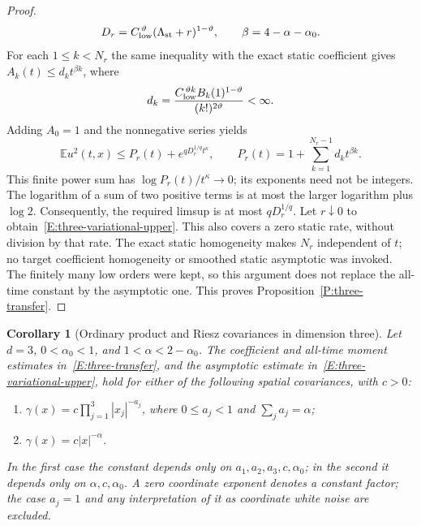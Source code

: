 \documentclass[12pt]{article}
\numberwithin{equation}{section}
\newtheorem{corollary}[theorem]{Corollary}
\theoremstyle{definition}
\newcommand{\E}{\mathbb{E}}
\begin{document}
\begin{proof}
\[    D_r=C_{\rm low}^{\,\vartheta}(\Lambda_{\rm st}+r)^{1-\vartheta},
    \qquad \beta=4-\alpha-\alpha_0.
  \]
  For each $1\le k<N_r$ the same inequality with the exact static
  coefficient gives $A_k(t)\le d_kt^{\beta k}$, where
  \[
    d_k=\frac{C_{\rm low}^{\,\vartheta k}
    B_k(1)^{1-\vartheta}}{(k!)^{2\vartheta}}<\infty.
  \]
  Adding $A_0=1$ and the nonnegative series yields
  \[
    \E u^2(t,x)\le P_r(t)+e^{qD_r^{1/q}t^\kappa},\qquad
    P_r(t)=1+\sum_{k=1}^{N_r-1}d_kt^{\beta k}.
  \]
  This finite power sum has $\log P_r(t)/t^\kappa\to0$; its
  exponents need not be integers. The logarithm of a sum of two
  positive terms is at most the larger logarithm plus $\log2$.
  Consequently, the required limsup is at most $qD_r^{1/q}$.
  Let $r\downarrow0$ to obtain~\eqref{E:three-variational-upper}.
  This also covers a zero static rate, without division by that rate.
  The exact static homogeneity makes $N_r$ independent of $t$;
  no target coefficient homogeneity or smoothed static asymptotic was
  invoked. The finitely many low orders were kept, so this argument
  does not replace the all-time constant by the asymptotic one.
  This proves Proposition~\ref{P:three-transfer}.
\end{proof}

\begin{corollary}[Ordinary product and Riesz covariances in dimension three]
  \label{C:three-product-riesz}
  Let $d=3$, $0<\alpha_0<1$, and $1<\alpha<2-\alpha_0$.
  The coefficient and all-time moment estimates in~\eqref{E:three-transfer},
  and the asymptotic estimate in~\eqref{E:three-variational-upper}, hold
  for either of the following spatial covariances, with $c>0$:
  \begin{enumerate}
    \item $\gamma(x)=c\prod_{j=1}^3|x_j|^{-a_j}$, where
      $0\le a_j<1$ and $\sum_j a_j=\alpha$;
    \item $\gamma(x)=c|x|^{-\alpha}$.
  \end{enumerate}
  In the first case the constant depends only on $a_1,a_2,a_3,c,\alpha_0$;
  in the second it depends only on $\alpha,c,\alpha_0$.
  A zero coordinate exponent denotes a constant factor; the case $a_j=1$
  and any interpretation of it as coordinate white noise are excluded.
\end{corollary}
\end{document}
